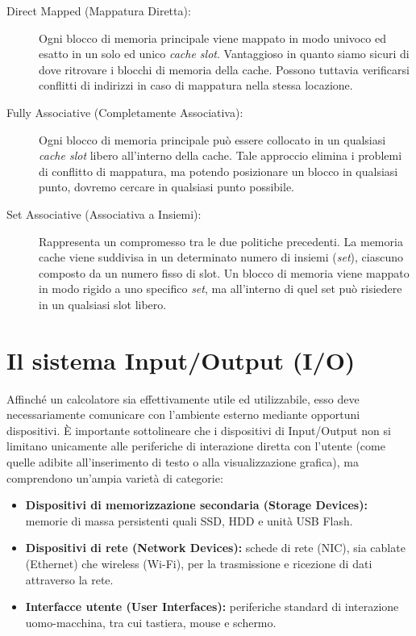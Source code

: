 \documentclass[12pt]{report}
\begin{document}
	\begin{description}
		\item [Direct Mapped (Mappatura Diretta):] Ogni blocco di memoria principale viene mappato in modo univoco ed esatto in un solo ed unico \textit{cache slot}. Vantaggioso in quanto siamo sicuri di dove ritrovare i blocchi di memoria della cache. Possono tuttavia verificarsi conflitti di indirizzi in caso di mappatura nella stessa locazione.
		
		\item [Fully Associative (Completamente Associativa):] Ogni blocco di memoria principale può essere collocato in un qualsiasi \textit{cache slot} libero all'interno della cache. Tale approccio elimina i problemi di conflitto di mappatura, ma potendo posizionare un blocco in qualsiasi punto, dovremo cercare in qualsiasi punto possibile.
		
		\item [Set Associative (Associativa a Insiemi):] Rappresenta un compromesso tra le due politiche precedenti. La memoria cache viene suddivisa in un determinato numero di insiemi (\textit{set}), ciascuno composto da un numero fisso di slot. Un blocco di memoria viene mappato in modo rigido a uno specifico \textit{set}, ma all'interno di quel set può risiedere in un qualsiasi slot libero.
	\end{description}
	
	\section{Il sistema Input/Output (I/O)}
	
	Affinché un calcolatore sia effettivamente utile ed utilizzabile, esso deve necessariamente comunicare con l'ambiente esterno mediante opportuni dispositivi. È importante sottolineare che i dispositivi di Input/Output non si limitano unicamente alle periferiche di interazione diretta con l'utente (come quelle adibite all'inserimento di testo o alla visualizzazione grafica), ma comprendono un'ampia varietà di categorie:
	
	\begin{itemize}
		\item \textbf{Dispositivi di memorizzazione secondaria (Storage Devices):} memorie di massa persistenti quali SSD, HDD e unità USB Flash.
		\item \textbf{Dispositivi di rete (Network Devices):} schede di rete (NIC), sia cablate (Ethernet) che wireless (Wi-Fi), per la trasmissione e ricezione di dati attraverso la rete.
		\item \textbf{Interfacce utente (User Interfaces):} periferiche standard di interazione uomo-macchina, tra cui tastiera, mouse e schermo.
	\end{itemize}
	
\end{document}
